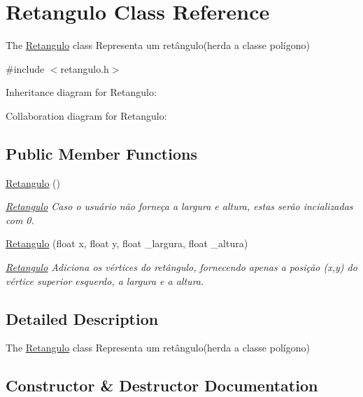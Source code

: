 \hypertarget{class_retangulo}{}\section{Retangulo Class Reference}
\label{class_retangulo}


The \hyperlink{class_retangulo}{Retangulo} class Representa um retângulo(herda a classe polígono)  




{\ttfamily \#include $<$retangulo.\+h$>$}



Inheritance diagram for Retangulo\+:


Collaboration diagram for Retangulo\+:
\subsection*{Public Member Functions}
\begin{DoxyCompactItemize}
\item 
\hyperlink{class_retangulo_ac21a81cae046920c8bee401bcb879562}{Retangulo} ()\hypertarget{class_retangulo_ac21a81cae046920c8bee401bcb879562}{}\label{class_retangulo_ac21a81cae046920c8bee401bcb879562}

\begin{DoxyCompactList}\small\item\em \hyperlink{class_retangulo}{Retangulo} Caso o usuário não forneça a largura e altura, estas serão incializadas com 0. \end{DoxyCompactList}\item 
\hyperlink{class_retangulo_a54988c3e6af9f464d751940e32941d88}{Retangulo} (float x, float y, float \+\_\+largura, float \+\_\+altura)
\begin{DoxyCompactList}\small\item\em \hyperlink{class_retangulo}{Retangulo} Adiciona os vértices do retângulo, fornecendo apenas a posição (x,y) do vértice superior esquerdo, a largura e a altura. \end{DoxyCompactList}\end{DoxyCompactItemize}


\subsection{Detailed Description}
The \hyperlink{class_retangulo}{Retangulo} class Representa um retângulo(herda a classe polígono) 

\subsection{Constructor \& Destructor Documentation}
